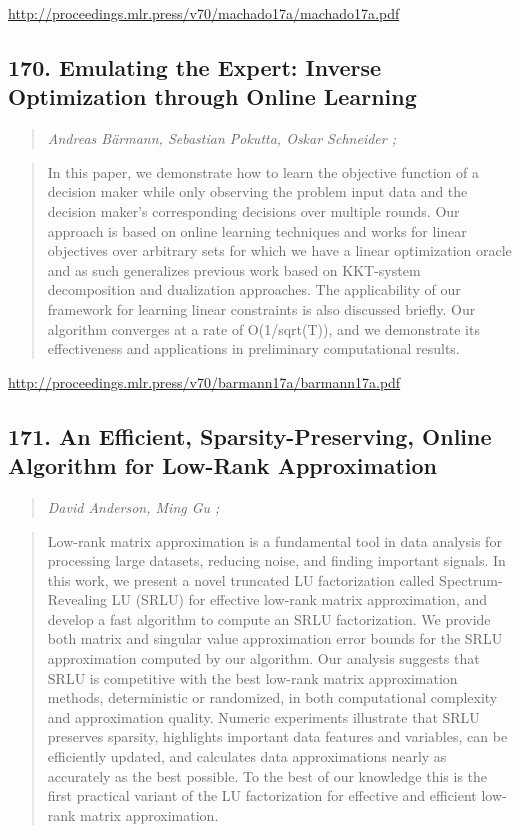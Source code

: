 \documentclass{article}
\begin{document}
\href{http://proceedings.mlr.press/v70/machado17a/machado17a.pdf}{http://proceedings.mlr.press/v70/machado17a/machado17a.pdf}

\subsection{170. Emulating the Expert: Inverse Optimization through Online Learning}

\begin{quote}
\footnotesize{\textit{Andreas Bärmann, Sebastian Pokutta, Oskar Schneider ;}}
\end{quote}

\begin{quote}
    In this paper, we demonstrate how to learn the objective function of a decision maker while only observing the problem input data and the decision maker’s corresponding decisions over multiple rounds. Our approach is based on online learning techniques and works for linear objectives over arbitrary sets for which we have a linear optimization oracle and as such generalizes previous work based on KKT-system decomposition and dualization approaches. The applicability of our framework for learning linear constraints is also discussed briefly. Our algorithm converges at a rate of O(1/sqrt(T)), and we demonstrate its effectiveness and applications in preliminary computational results.  \end{quote}

\href{http://proceedings.mlr.press/v70/barmann17a/barmann17a.pdf}{http://proceedings.mlr.press/v70/barmann17a/barmann17a.pdf}

\subsection{171. An Efficient, Sparsity-Preserving, Online Algorithm for Low-Rank Approximation}

\begin{quote}
\footnotesize{\textit{David Anderson, Ming Gu ;}}
\end{quote}

\begin{quote}
    Low-rank matrix approximation is a fundamental tool in data analysis for processing large datasets, reducing noise, and finding important signals. In this work, we present a novel truncated LU factorization called Spectrum-Revealing LU (SRLU) for effective low-rank matrix approximation, and develop a fast algorithm to compute an SRLU factorization. We provide both matrix and singular value approximation error bounds for the SRLU approximation computed by our algorithm. Our analysis suggests that SRLU is competitive with the best low-rank matrix approximation methods, deterministic or randomized, in both computational complexity and approximation quality. Numeric experiments illustrate that SRLU preserves sparsity, highlights important data features and variables, can be efficiently updated, and calculates data approximations nearly as accurately as the best possible. To the best of our knowledge this is the first practical variant of the LU factorization for effective and efficient low-rank matrix approximation.  \end{quote}
\end{document}
